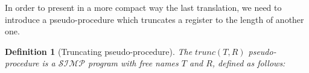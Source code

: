 \documentclass[10pt]{amsart}
\newcommand{\SIMP}{\mathcal{SIMP}}
\newcommand{\zero}{\mathtt{0}}
\newcommand{\one}{\mathtt{1}}
\newcommand{\while}[2]{\mathbf{while}(#1)\{#2\}}
\newcommand{\takes}{\leftarrow}
\newtheorem{defn}{Definition}
\begin{document}
In order to present in a more compact way the last translation, we need to introduce a pseudo-procedure which truncates a register to the length of another one.

\begin{defn}[Truncating pseudo-procedure]
The $trunc(T, R)$ pseudo-procedure is a $\SIMP$ program with free names $T$ and $R$, defined as follows:

\begin{comment}
\begin{align*}
trunc(T, R) \coloneqq &Q \takes R;\\
                      &R \takes \epsilon;\\
                      &Z \takes \epsilon;\\
                      &\while {Z \sqsubset T} {\\
                      &\quad B \takes \one;\\
                      &\quad \while {Z.\zero \sqsubseteq T \land B} {\\
                      &\quad \quad B \takes \one;\\
                      &\quad \quad \while {R.\zero \sqsubseteq Q \land B} {\\
                      &\quad \quad \quad R \takes R.\zero;\\
                      &\quad \quad \quad B \takes \zero;\\
                      &\quad \quad \quad }\\
                      &\quad \quad \while {R.\one \sqsubseteq Q \land B} {\\
                      &\quad \quad \quad R \takes R.\one;\\
                      &\quad \quad \quad B \takes \zero;\\
                      &\quad \quad \quad }\\
                      &\quad \quad Z \takes Z.0;\\
                      &\quad \quad B \takes 0;\\
                      &\quad \quad }\\
                      &\quad \while {Z.\one \sqsubseteq T \land B} {\\
                      &\quad \quad B \takes \one;\\
                      &\quad \quad \while {R.\zero \sqsubseteq Q \land B} {\\
                      &\quad \quad \quad R \takes R.\zero;\\

\end{comment}
\end{defn}
\end{document}

